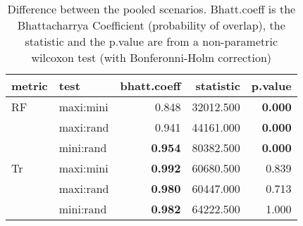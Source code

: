 \begin{table}[ht]
\centering
\begin{tabular}{llr|rr}
  \hline
metric & test & bhatt.coeff & statistic & p.value \\ 
  \hline
RF & maxi:mini & 0.848 & 32012.500 & \textbf{0.000} \\ 
   & maxi:rand & 0.941 & 44161.000 & \textbf{0.000} \\ 
   & mini:rand & \textbf{0.954} & 80382.500 & \textbf{0.000} \\ 
  Tr & maxi:mini & \textbf{0.992} & 60680.500 & 0.839 \\ 
   & maxi:rand & \textbf{0.980} & 60447.000 & 0.713 \\ 
   & mini:rand & \textbf{0.982} & 64222.500 & 1.000 \\ 
   \hline
\end{tabular}
\caption{Difference between the pooled scenarios. Bhatt.coeff is the Bhattacharrya Coefficient (probability of overlap), the statistic and the p.value are from a non-parametric wilcoxon test (with Bonferonni-Holm correction)} 
\label{Tab_pooledscenarios_test}
\end{table}
